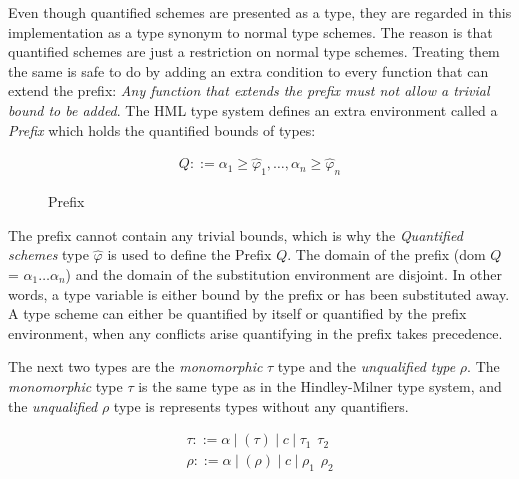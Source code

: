 \documentclass[twoside, titlepage, openright, a4paper]{book}
\renewcommand{\geq}{\geqslant}
\begin{document}
Even though quantified schemes are presented as a type, they are regarded in this implementation as a type synonym to normal type schemes. The reason is that quantified schemes are just a restriction on normal type schemes. Treating them the same is safe to do by adding an extra condition to every function that can extend the prefix: \emph{Any function that extends the prefix must not allow a trivial bound to be added}.
The HML type system defines an extra environment called a \emph{Prefix} which holds the quantified bounds of types:

\begin{figure}[H]
\begin{eqnarray*}
Q ::= \alpha_1\geq\hat{\varphi}_1,\ldots,\alpha_n\geq\hat{\varphi}_n
\end{eqnarray*}
\caption{Prefix}
\label{Prefix}
\end{figure}

The prefix cannot contain any trivial bounds, which is why the \emph{Quantified schemes} type $\hat{\varphi}$ is used to define the Prefix $Q$. The domain of the prefix (dom $Q$ = ${\alpha_1 \ldots \alpha_n}$) and the domain of the substitution environment are disjoint. In other words, a type variable is either bound by the prefix or has been substituted away. A type scheme can either be quantified by itself or quantified by the prefix environment, when any conflicts arise quantifying in the prefix takes precedence.

The next two types are the \emph{monomorphic} $\tau$ type and the \emph{unqualified type} $\rho$. The \emph{monomorphic} type $\tau$ is the same type as in the Hindley-Milner type system, and the \emph{unqualified} $\rho$ type is represents types without any quantifiers. 

\begin{eqnarray*}
\tau  ::= \alpha \hspace{3pt} | \hspace{3pt} (\tau) \hspace{3pt} | \hspace{3pt} c \hspace{3pt} | \hspace{3pt} \tau_1 \hspace{5pt} \tau_2 \\
\rho  ::= \alpha \hspace{3pt} | \hspace{3pt} (\rho) \hspace{3pt} | \hspace{3pt} c \hspace{3pt} | \hspace{3pt} \rho_1 \hspace{5pt} \rho_2
\end{eqnarray*}
\end{document}
